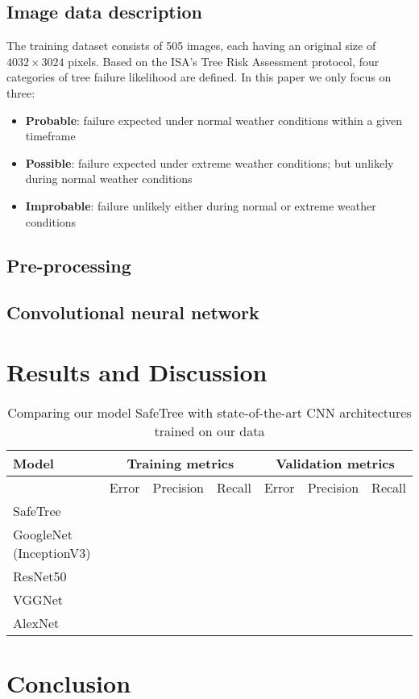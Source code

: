 \documentclass[11pt,twoside]{article}
\numberwithin{equation}{section}
\newcommand{\?}{\stackrel{?}{=}}
\begin{document}
\subsection{Image data description}
The training dataset consists of 505 images, each having an original size of $4032\times3024$ pixels. 
Based on the  ISA’s Tree Risk Assessment protocol, four categories of tree failure likelihood are defined. In this paper we only focus on three:
\begin{itemize}
\item \textbf{Probable}: failure expected under normal weather conditions within a given timeframe
\item \textbf{Possible}: failure expected under extreme weather conditions; but unlikely during normal weather conditions
\item \textbf{Improbable}: failure unlikely either during normal or extreme weather conditions 
\end{itemize}

\subsection{Pre-processing}

\subsection{Convolutional neural network}

\section{Results and Discussion}

\begin{table}[h!]
  \centering
  \begin{tabular}{l l l l l l l }\toprule
    \bf Model & \multicolumn{3}{c}{\bf Training metrics} &\multicolumn{3}{c}{\bf Validation metrics}  \\\midrule
    & Error & Precision & Recall     & Error & Precision & Recall \\
    SafeTree & & & & & & \\
    GoogleNet (InceptionV3) & & & & & & \\
    ResNet50 & & & & & & \\
        VGGNet & & & & & & \\
    AlexNet & & & & & & \\\bottomrule
  \end{tabular}
  \caption{Comparing our model SafeTree with state-of-the-art CNN architectures trained on our data}
  \label{tab:comp}
\end{table}

\section{Conclusion}

\printbibliography

\appendix
\end{document}
